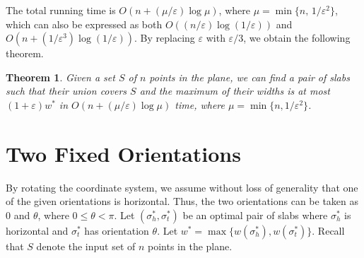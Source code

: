 \documentclass[10pt,a4paper]{article}
\newtheorem{theorem}{Theorem}
\theoremstyle{star}
\theoremstyle{claimstar}
\newcommand{\eps}{\ensuremath{\varepsilon}}
\begin{document}
The total running time is 
$O(n + (\mu/\eps)\log \mu )$, where $ \mu = \min\{n,\, 1/\eps^2\}$, 
which can also be expressed as both $O((n/\eps)\log(1/\eps))$ and $O(n + (1/\eps^3)\log(1/\eps))$. 
By replacing $\eps$ with $\eps/3$, we obtain the following theorem.






\begin{theorem}
    Given a set $S$ of $n$ points in the plane, we can find a pair of slabs such that their union covers $S$ and the maximum of their widths is at most $(1+\eps)w^*$ in $O(n + (\mu/\eps) \log \mu)$ time, where $\mu = \min \{n, 1/\eps^2 \}$.
\end{theorem}


\section{Two Fixed Orientations}
\label{sec:two_fixed}



By rotating the coordinate system, we assume without loss of generality that one of the given orientations is horizontal. Thus, the two orientations can be taken as $0$ and $\theta$, where $0 \leq \theta < \pi$.
Let $(\sigma_h^*, \sigma_t^* )$ be an optimal pair of slabs where $\sigma_h^*$ is horizontal and $\sigma_t^*$ has orientation $\theta$.
Let $w^* = \max \{w(\sigma_h^*), w(\sigma_t^*) \}$.
Recall that $S$ denote the input set of $n$ points in the plane.

\end{document}
